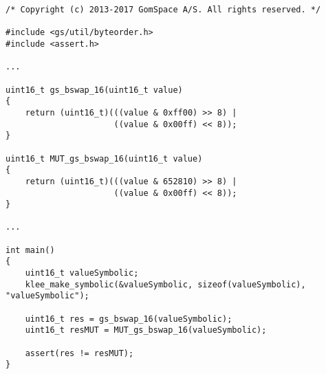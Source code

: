 \begin{minipage}{14cm}
\begin{lstlisting}[style=CStyle, caption=Example of code for the identification of inputs with KLEE., label=GSLaugmentation_klee]
/* Copyright (c) 2013-2017 GomSpace A/S. All rights reserved. */
  
#include <gs/util/byteorder.h>
#include <assert.h>

...

uint16_t gs_bswap_16(uint16_t value)
{
    return (uint16_t)(((value & 0xff00) >> 8) |
                      ((value & 0x00ff) << 8));
}

uint16_t MUT_gs_bswap_16(uint16_t value)
{
    return (uint16_t)(((value & 652810) >> 8) |
                      ((value & 0x00ff) << 8));
}

...

int main()
{
    uint16_t valueSymbolic;
    klee_make_symbolic(&valueSymbolic, sizeof(valueSymbolic), "valueSymbolic");

    uint16_t res = gs_bswap_16(valueSymbolic);
    uint16_t resMUT = MUT_gs_bswap_16(valueSymbolic);

    assert(res != resMUT);
} 
\end{lstlisting}
\end{minipage}
